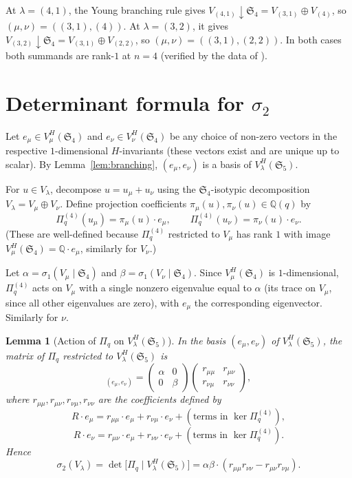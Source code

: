\documentclass[11pt]{article}
\theoremstyle{plain}
\newtheorem{lemma}[theorem]{Lemma}
\theoremstyle{definition}
\theoremstyle{remark}
\newcommand{\Q}{\mathbb{Q}}
\newcommand{\Sym}{\mathfrak{S}}
\newcommand{\Pibs}{\Pi_q}
\begin{document}
At $\lambda = (4,1)$, the Young branching rule gives $V_{(4,1)} \downarrow \Sym_4 = V_{(3,1)} \oplus V_{(4)}$, so $(\mu, \nu) = ((3,1), (4))$.
At $\lambda = (3,2)$, it gives $V_{(3,2)} \downarrow \Sym_4 = V_{(3,1)} \oplus V_{(2,2)}$, so $(\mu, \nu) = ((3,1), (2,2))$.
In both cases both summands are rank-$1$ at $n = 4$ (verified by the data of \cite{Clio_sigma1}).

\section{Determinant formula for $\sigma_2$}\label{sec:det}

Let $e_\mu \in V_\mu^H(\Sym_4)$ and $e_\nu \in V_\nu^H(\Sym_4)$ be any choice of
non-zero vectors in the respective $1$-dimensional $H$-invariants (these vectors
exist and are unique up to scalar). By Lemma~\ref{lem:branching}, $(e_\mu, e_\nu)$
is a basis of $V_\lambda^H(\Sym_5)$.

For $u \in V_\lambda$, decompose $u = u_\mu + u_\nu$ using the $\Sym_4$-isotypic
decomposition $V_\lambda = V_\mu \oplus V_\nu$. Define projection coefficients
$\pi_\mu(u), \pi_\nu(u) \in \Q(q)$ by
\[ \Pibs^{(4)} (u_\mu) = \pi_\mu(u) \cdot e_\mu, \qquad \Pibs^{(4)} (u_\nu) = \pi_\nu(u) \cdot e_\nu. \]
(These are well-defined because $\Pibs^{(4)}$ restricted to $V_\mu$ has rank $1$ with image $V_\mu^H(\Sym_4) = \Q \cdot e_\mu$, similarly for $V_\nu$.)

Let $\alpha = \sigma_1(V_\mu \mid \Sym_4)$ and $\beta = \sigma_1(V_\nu \mid \Sym_4)$.
Since $V_\mu^H(\Sym_4)$ is $1$-dimensional, $\Pibs^{(4)}$ acts on $V_\mu$ with a single
nonzero eigenvalue equal to $\alpha$ (its trace on $V_\mu$, since all other
eigenvalues are zero), with $e_\mu$ the corresponding eigenvector. Similarly for $\nu$.

\begin{lemma}[Action of $\Pibs$ on $V_\lambda^H(\Sym_5)$]\label{lem:matrix}
In the basis $(e_\mu, e_\nu)$ of $V_\lambda^H(\Sym_5)$, the matrix of $\Pibs$
restricted to $V_\lambda^H(\Sym_5)$ is
\begin{equation}
[\Pibs]_{(e_\mu, e_\nu)} = \begin{pmatrix} \alpha & 0 \\ 0 & \beta \end{pmatrix}
\begin{pmatrix} r_{\mu\mu} & r_{\mu\nu} \\ r_{\nu\mu} & r_{\nu\nu} \end{pmatrix}, \label{eq:matrix}
\end{equation}
where $r_{\mu\mu}, r_{\mu\nu}, r_{\nu\mu}, r_{\nu\nu}$ are the coefficients defined by
\[ R \cdot e_\mu = r_{\mu\mu} \cdot e_\mu + r_{\nu\mu} \cdot e_\nu + (\text{terms in } \ker \Pibs^{(4)}), \]
\[ R \cdot e_\nu = r_{\mu\nu} \cdot e_\mu + r_{\nu\nu} \cdot e_\nu + (\text{terms in } \ker \Pibs^{(4)}). \]
Hence
\[ \sigma_2(V_\lambda) = \det\big[\Pibs \mid V_\lambda^H(\Sym_5)\big]
 = \alpha \beta \cdot (r_{\mu\mu} r_{\nu\nu} - r_{\mu\nu} r_{\nu\mu}). \]
\end{lemma}
\end{document}
